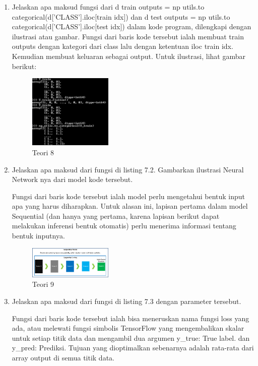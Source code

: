 \begin{enumerate}
	\item Jelaskan apa maksud fungsi dari d train outputs = np utils.to categorical(d[’CLASS’].iloc[train idx]) dan d test outputs = np utils.to categorical(d[’CLASS’].iloc[test idx]) dalam kode program, dilengkapi dengan ilustrasi atau gambar.
	\hfill\break
	Fungsi dari baris kode tersebut ialah membuat train outputs dengan kategori dari class lalu dengan ketentuan iloc train idx. Kemudian membuat keluaran sebagai output. Untuk ilustrasi, lihat gambar berikut: 

	\begin{figure}[H]
	\centering
		\includegraphics[width=4cm]{figures/1174080/7/materi/teori8.PNG}
		\caption{Teori 8}
	\end{figure}

	\item Jelaskan apa maksud dari fungsi di listing 7.2. Gambarkan ilustrasi Neural Network nya dari model kode tersebut.
	\hfill\break

	

	Fungsi dari baris kode tersebut ialah model perlu mengetahui bentuk input apa yang harus diharapkan. Untuk alasan ini, lapisan pertama dalam model Sequential (dan hanya yang pertama, karena lapisan berikut dapat melakukan inferensi bentuk otomatis) perlu menerima informasi tentang bentuk inputnya.

	\begin{figure}[H]
	\centering
		\includegraphics[width=4cm]{figures/1174080/7/materi/teori9.PNG}
		\caption{Teori 9}
	\end{figure}

	\item Jelaskan apa maksud dari fungsi di listing 7.3 dengan parameter tersebut.
	\hfill\break

	

	Fungsi dari baris kode tersebut ialah bisa meneruskan nama fungsi loss yang ada, atau melewati fungsi simbolis TensorFlow yang mengembalikan skalar untuk setiap titik data dan mengambil dua argumen y\_true: True label. dan  y\_pred: Prediksi. Tujuan yang dioptimalkan sebenarnya adalah rata-rata dari array output di semua titik data.


\end{enumerate}

